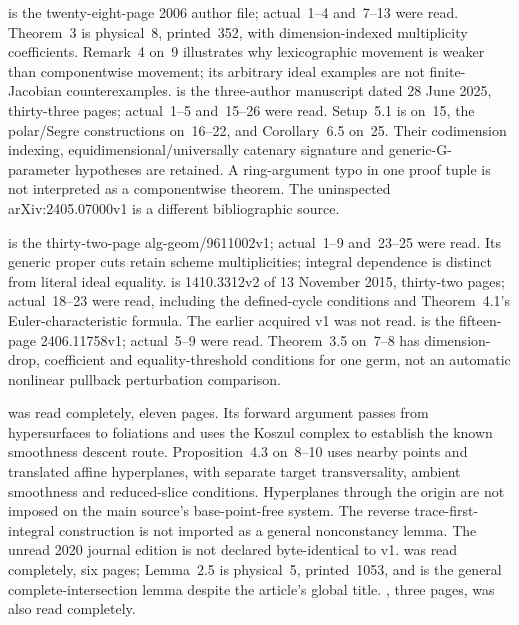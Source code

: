 \cite{AchillesManaresi06Author} is the twenty-eight-page
2006 author file; actual~1--4 and~7--13 were read.
Theorem~3 is physical~8, printed~352, with dimension-indexed
multiplicity coefficients. Remark~4 on~9 illustrates why
lexicographic movement is weaker than componentwise movement;
its arbitrary ideal examples are not finite-Jacobian
counterexamples. \cite{CidRuizPoliniUlrich25Author} is the
three-author manuscript dated 28 June 2025, thirty-three pages;
actual~1--5 and~15--26 were read. Setup~5.1 is on~15,
the polar/Segre constructions on~16--22, and Corollary~6.5
on~25. Their codimension indexing, equidimensional/universally
catenary signature and generic-G-parameter hypotheses are
retained. A ring-argument typo in one proof tuple is not
interpreted as a componentwise theorem. The uninspected
arXiv:2405.07000v1 is a different bibliographic source.

\cite{GaffneyGassler96SegreV1} is the thirty-two-page
alg-geom/9611002v1; actual~1--9 and~23--25 were read.
Its generic proper cuts retain scheme multiplicities;
integral dependence is distinct from literal ideal equality.
\cite{Massey15LeCyclesV2} is 1410.3312v2 of 13 November
2015, thirty-two pages; actual~18--23 were read, including
the defined-cycle conditions and Theorem~4.1's
Euler-characteristic formula. The earlier acquired v1 was
not read. \cite{Massey24MinkowskiV1} is the fifteen-page
2406.11758v1; actual~5--9 were read. Theorem~3.5 on~7--8
has dimension-drop, coefficient and equality-threshold
conditions for one germ, not an automatic nonlinear
pullback perturbation comparison.

\cite{GiraldoRoeder19PullbackV1} was read completely,
eleven pages. Its forward argument passes from hypersurfaces
to foliations and uses the Koszul complex to establish
the known smoothness descent route.
Proposition~4.3 on~8--10 uses nearby points and translated
affine hyperplanes, with separate target transversality,
ambient smoothness and reduced-slice conditions. Hyperplanes
through the origin are not imposed on the main source's
base-point-free system. The reverse trace-first-integral
construction is not imported as a general nonconstancy
lemma. The unread 2020 journal edition is not declared
byte-identical to v1. \cite{JelonekTibar15Published} was
read completely, six pages; Lemma~2.5 is physical~5,
printed~1053, and is the general complete-intersection
lemma despite the article's global title.
\cite{Jelonek23MilnorV1}, three pages, was also read completely.

